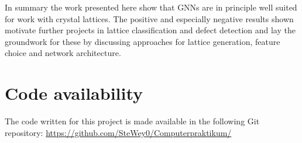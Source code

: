 \documentclass[11pt,a4paper]{article}
\begin{document}
In summary the work presented here show that GNNs are in principle well suited for work with crystal lattices. The positive and especially negative results shown motivate further projects in lattice classification and defect detection and lay the groundwork for these by discussing approaches for lattice generation, feature choice and network architecture.


\section{Code availability}
\label{sec:Code availability}
The code written for this project is made available in the following Git repository: \url{https://github.com/SteWey0/Computerpraktikum/}


\renewcommand\refname{Bibliography}
\printbibliography[
heading=bibintoc,
title={Bibliography}
]
\end{document}
